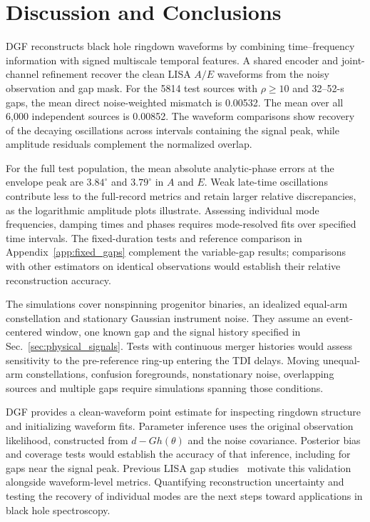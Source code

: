 \documentclass[10pt,prd,aps,a4paper,twocolumn,superscriptaddress,nofootinbib,floatfix]{revtex4-2}
\begin{document}
\section{Discussion and Conclusions}\label{sec:discussion}
DGF reconstructs black hole ringdown waveforms by combining time--frequency information with signed multiscale temporal features. A shared encoder and joint-channel refinement recover the clean LISA $A/E$ waveforms from the noisy observation and gap mask. For the 5814 test sources with $\rho\ge10$ and 32--52-s gaps, the mean direct noise-weighted mismatch is 0.00532. The mean over all 6,000 independent sources is 0.00852. The waveform comparisons show recovery of the decaying oscillations across intervals containing the signal peak, while amplitude residuals complement the normalized overlap.

For the full test population, the mean absolute analytic-phase errors at the envelope peak are $3.84^\circ$ and $3.79^\circ$ in $A$ and $E$. Weak late-time oscillations contribute less to the full-record metrics and retain larger relative discrepancies, as the logarithmic amplitude plots illustrate. Assessing individual mode frequencies, damping times and phases requires mode-resolved fits over specified time intervals. The fixed-duration tests and reference comparison in Appendix~\ref{app:fixed_gaps} complement the variable-gap results; comparisons with other estimators on identical observations would establish their relative reconstruction accuracy.

The simulations cover nonspinning progenitor binaries, an idealized equal-arm constellation and stationary Gaussian instrument noise. They assume an event-centered window, one known gap and the signal history specified in Sec.~\ref{sec:physical_signals}. Tests with continuous merger histories would assess sensitivity to the pre-reference ring-up entering the TDI delays. Moving unequal-arm constellations, confusion foregrounds, nonstationary noise, overlapping sources and multiple gaps require simulations spanning those conditions.

DGF provides a clean-waveform point estimate for inspecting ringdown structure and initializing waveform fits. Parameter inference uses the original observation likelihood, constructed from $d-Gh(\theta)$ and the noise covariance. Posterior bias and coverage tests would establish the accuracy of that inference, including for gaps near the signal peak. Previous LISA gap studies~\cite{Baghi2019,Mao:2025cae} motivate this validation alongside waveform-level metrics. Quantifying reconstruction uncertainty and testing the recovery of individual modes are the next steps toward applications in black hole spectroscopy.
\end{document}
